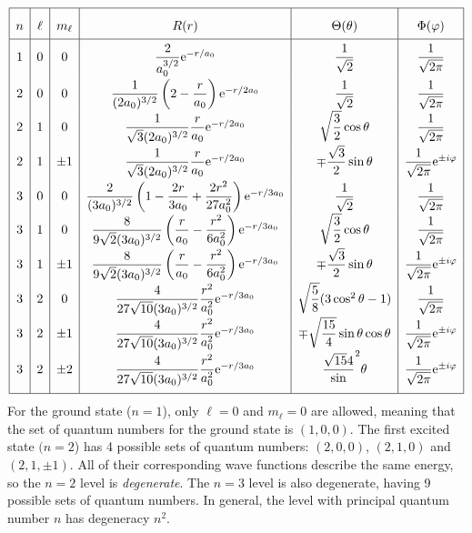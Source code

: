 \documentclass{subfiles}
\begin{document}
				\[\renewcommand{\arraystretch}{2}\begin{array}{|c|c|c|c|c|c|}\hline
					n & \ell & m_\ell & R(r) & \Theta(\theta) & \Phi(\varphi) \\\hline
					1 & 0 & 0 & \dfrac{2}{a_0^{3/2}}\en^{-r/a_0} & \dfrac{1}{\sqrt{2}} & \dfrac{1}{\sqrt{2\pi}} \\
					2 & 0 & 0 & \dfrac{1}{(2a_0)^{3/2}}\left(2 - \dfrac{r}{a_0}\right)\en^{-r/2a_0} & \dfrac{1}{\sqrt{2}} & \dfrac{1}{\sqrt{2\pi}} \\
					2 & 1 & 0 & \dfrac{1}{\sqrt{3}(2a_0)^{3/2}}\dfrac{r}{a_0}\en^{-r/2a_0} & \sqrt{\dfrac{3}{2}}\cos\theta & \dfrac{1}{\sqrt{2\pi}} \\
					2 & 1 & \pm 1 & \dfrac{1}{\sqrt{3}(2a_0)^{3/2}}\dfrac{r}{a_0}\en^{-r/2a_0} & \mp\dfrac{\sqrt{3}}{2}\sin\theta & \dfrac{1}{\sqrt{2\pi}}\en^{\pm i\varphi} \\
					3 & 0 & 0 & \dfrac{2}{(3a_0)^{3/2}}\left(1 - \dfrac{2r}{3a_0} + \dfrac{2r^2}{27a_0^2}\right)\en^{-r/3a_0} & \dfrac{1}{\sqrt{2}} & \dfrac{1}{\sqrt{2\pi}} \\
					3 & 1 & 0 & \dfrac{8}{9\sqrt{2}(3a_0)^{3/2}}\left(\dfrac{r}{a_0} - \dfrac{r^2}{6a_0^2}\right)\en^{-r/3a_0} & \sqrt{\dfrac{3}{2}}\cos\theta & \dfrac{1}{\sqrt{2\pi}} \\
					3 & 1 & \pm 1 & \dfrac{8}{9\sqrt{2}(3a_0)^{3/2}}\left(\dfrac{r}{a_0} - \dfrac{r^2}{6a_0^2}\right)\en^{-r/3a_0} & \mp\dfrac{\sqrt{3}}{2}\sin\theta & \dfrac{1}{\sqrt{2\pi}}\en^{\pm i\varphi} \\
					3 & 2 & 0 & \dfrac{4}{27\sqrt{10}(3a_0)^{3/2}}\dfrac{r^2}{a_0^2}\en^{-r/3a_0} & \sqrt{\dfrac{5}{8}}(3\cos^2\theta - 1) & \dfrac{1}{\sqrt{2\pi}} \\
					3 & 2 & \pm 1 & \dfrac{4}{27\sqrt{10}(3a_0)^{3/2}}\dfrac{r^2}{a_0^2}\en^{-r/3a_0} & \mp\sqrt{\dfrac{15}{4}}\sin\theta\cos\theta & \dfrac{1}{\sqrt{2\pi}}\en^{\pm i\varphi} \\
					3 & 2 & \pm 2 & \dfrac{4}{27\sqrt{10}(3a_0)^{3/2}}\dfrac{r^2}{a_0^2}\en^{-r/3a_0} & \dfrac{\sqrt{15}{4}}\sin^2\theta & \dfrac{1}{\sqrt{2\pi}}\en^{\pm i\varphi} \\[2ex]\hline
				\end{array}\]
			For the ground state (\(n = 1\)), only \(\ell = 0\) and \(m_\ell = 0\) are allowed, meaning that the set of quantum numbers for the ground state is \((1, 0, 0)\). The first excited state \((n = 2\)) has 4 possible sets of quantum numbers: \((2, 0, 0)\), \((2, 1, 0)\) and \((2, 1, \pm 1)\). All of their corresponding wave functions describe the same energy, so the \(n = 2\) level is \textit{degenerate}. The \(n = 3\) level is also degenerate, having 9 possible sets of quantum numbers. In general, the level with principal quantum number \(n\) has degeneracy \(n^2\). \\
\end{document}
